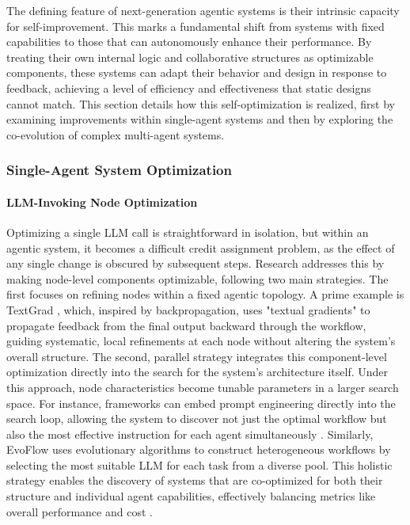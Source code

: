 The defining feature of next-generation agentic systems is their intrinsic capacity for self-improvement. This marks a fundamental shift from systems with fixed capabilities to those that can autonomously enhance their performance\citep{liu2025advances}. By treating their own internal logic and collaborative structures as optimizable components, these systems can adapt their behavior and design in response to feedback, achieving a level of efficiency and effectiveness that static designs cannot match. 
This section details how this self-optimization is realized, first by examining improvements within single-agent systems and then by exploring the co-evolution of complex multi-agent systems.



\subsubsection{Single-Agent System Optimization}

\paragraph{LLM-Invoking Node Optimization}

Optimizing a single LLM call is straightforward in isolation, but within an agentic system, it becomes a difficult credit assignment problem, as the effect of any single change is obscured by subsequent steps. Research addresses this by making node-level components optimizable, following two main strategies. The first focuses on refining nodes within a fixed agentic topology. A prime example is TextGrad \citep{yellamraju2024textgrad}, which, inspired by backpropagation, uses "textual gradients" to propagate feedback from the final output backward through the workflow, guiding systematic, local refinements at each node without altering the system's overall structure. The second, parallel strategy integrates this component-level optimization directly into the search for the system's architecture itself. Under this approach, node characteristics become tunable parameters in a larger search space. For instance, frameworks can embed prompt engineering directly into the search loop, allowing the system to discover not just the optimal workflow but also the most effective instruction for each agent simultaneously \citep{zhou2025maasprompt}. Similarly, EvoFlow \citep{zhang2025evoflow} uses evolutionary algorithms to construct heterogeneous workflows by selecting the most suitable LLM for each task from a diverse pool. This holistic strategy enables the discovery of systems that are co-optimized for both their structure and individual agent capabilities, effectively balancing metrics like overall performance and cost \citep{ye2025xmas}.

